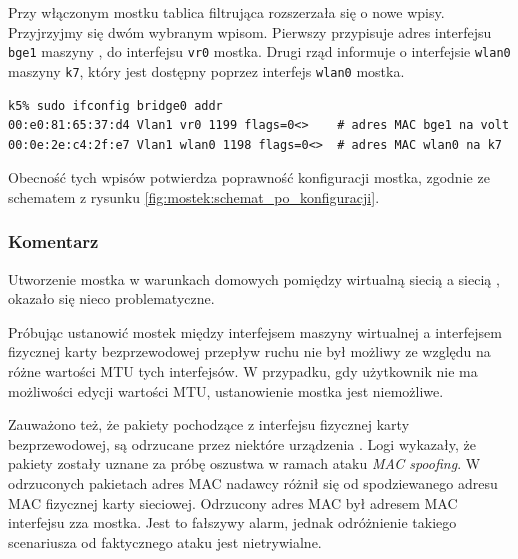 Przy włączonym mostku tablica filtrująca rozszerzała się o nowe wpisy.
Przyjrzyjmy się dwóm wybranym wpisom. Pierwszy przypisuje adres interfejsu
\texttt{bge1} maszyny \volt{}, do interfejsu \texttt{vr0} mostka. Drugi rząd
informuje o interfejsie \texttt{wlan0} maszyny \texttt{k7}, który jest dostępny
poprzez interfejs \texttt{wlan0} mostka.

\begin{lstlisting}
k5% sudo ifconfig bridge0 addr
00:e0:81:65:37:d4 Vlan1 vr0 1199 flags=0<>    # adres MAC bge1 na volt
00:0e:2e:c4:2f:e7 Vlan1 wlan0 1198 flags=0<>  # adres MAC wlan0 na k7
\end{lstlisting}

Obecność tych wpisów potwierdza poprawność konfiguracji mostka, zgodnie ze
schematem z rysunku \ref{fig:mostek:schemat_po_konfiguracji}.


\subsubsection{Komentarz}

Utworzenie mostka w warunkach domowych pomiędzy wirtualną siecią \eth{} a
siecią \wifi, okazało się nieco problematyczne.

Próbując ustanowić mostek między interfejsem \eth{} maszyny wirtualnej a
interfejsem fizycznej karty bezprzewodowej przepływ ruchu nie był możliwy ze
względu na różne wartości MTU tych interfejsów. W przypadku, gdy użytkownik nie
ma możliwości edycji wartości MTU, ustanowienie mostka jest niemożliwe.

Zauważono też, że pakiety pochodzące z interfejsu fizycznej karty
bezprzewodowej, są odrzucane przez niektóre urządzenia \wifi. Logi wykazały, że
pakiety zostały uznane za próbę oszustwa w ramach ataku \emph{MAC spoofing}. W
odrzuconych pakietach adres MAC nadawcy różnił się od spodziewanego adresu MAC
fizycznej karty sieciowej. Odrzucony adres MAC był adresem MAC interfejsu zza
mostka. Jest to fałszywy alarm, jednak odróżnienie takiego scenariusza od
faktycznego ataku jest nietrywialne.
